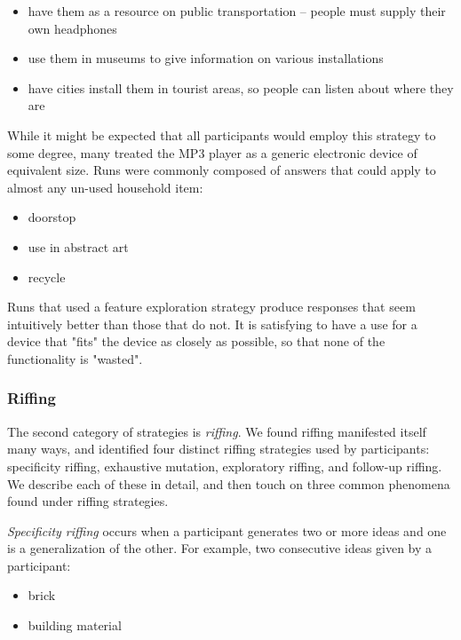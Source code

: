\begin{itemize}
    \item have them as a resource on public transportation -- people must supply their own headphones
    \item use them in museums to give information on various installations
    \item have cities install them in tourist areas, so people can listen about where they are
\end{itemize}

While it might be expected that all participants would employ this strategy to some degree, many treated the MP3 player as a generic electronic device of equivalent size. Runs were commonly composed of answers that could apply to almost any un-used household item:

\begin{itemize}
    \item doorstop
    \item use in abstract art
    \item recycle
\end{itemize}

Runs that used a feature exploration strategy produce responses that seem intuitively better than those that do not. It is satisfying to have a use for a device that "fits" the device as closely as possible, so that none of the functionality is "wasted". 

\subsubsection{Riffing}

The second category of strategies is \emph{riffing}.
We found riffing manifested itself many ways, and identified four distinct riffing strategies used by participants: specificity riffing, exhaustive mutation, exploratory riffing, and follow-up riffing. We describe each of these in detail, and then touch on three common phenomena found under riffing strategies.

\emph{Specificity riffing} occurs when a participant generates two or more ideas and one is a generalization of the other. For example, two consecutive ideas given by a participant:

\begin{itemize}
    \item brick
    \item building material
\end{itemize}

